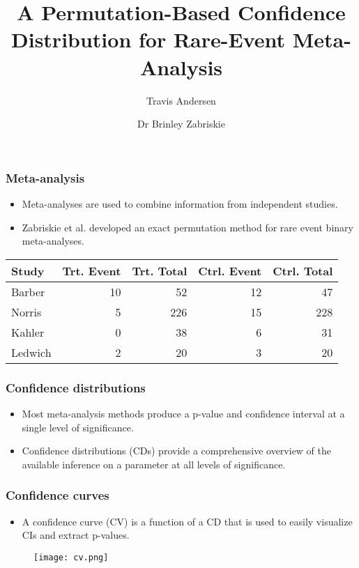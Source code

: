 \documentclass{beamer}
\title{A Permutation-Based Confidence Distribution for Rare-Event Meta-Analysis}
\author{Travis Andersen \and Dr Brinley Zabriskie}
\begin{document}
\begin{frame}
  \maketitle
\end{frame}

\begin{frame} 
  \frametitle{Meta-analysis}
  \begin{itemize}
    \item Meta-analyses are used to combine information from independent studies.
    \item Zabriskie et al. developed an exact permutation method for rare event binary meta-analyses.
  \end{itemize}
  \begin{table}
    \small
    \begin{tabular}{|l|r|r|r|r|}
      \hline
      Study & Trt. Event & Trt. Total & Ctrl. Event & Ctrl. Total\\
      \hline
      Barber & 10 & 52 & 12 & 47\\
      \hline
      Norris & 5 & 226 & 15 & 228\\
      \hline
      Kahler & 0 & 38 & 6 & 31\\
      \hline
      Ledwich & 2 & 20 & 3 & 20\\
      \hline
    \end{tabular}
  \end{table}
\end{frame}

\begin{frame} 
  \frametitle{Confidence distributions}
  \begin{itemize}
    \item Most meta-analysis methods produce a p-value and confidence interval at a single level of significance.
    \item Confidence distributions (CDs) provide a comprehensive overview of the available inference on a parameter at all levels of significance.
  \end{itemize}
\end{frame}

\begin{frame} 
  \frametitle{Confidence curves}
  \begin{itemize}
    \item A confidence curve (CV) is a function of a CD that is used to easily
    visualize CIs and extract p-values.
  \end{itemize}
  \begin{figure}
    \texttt{[image: cv.png]}
  \end{figure}
\end{frame}
\end{document}

